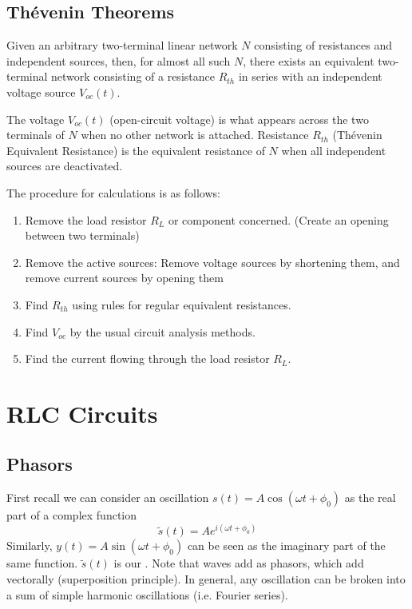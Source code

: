 \documentclass[12pt, a4paper, oneside, openright, titlepage]{book}
\begin{document}
\subsection{Th\'{e}venin Theorems}

\begin{thm}
    Given an arbitrary two-terminal linear network $N$ consisting of resistances and independent sources, then, for almost all such $N$, there exists an equivalent two-terminal network consisting of a resistance $R_{th}$ in series with an independent voltage source $V_{oc}(t)$.
\end{thm}

The voltage $V_{oc}(t)$ (open-circuit voltage) is what appears across the two terminals of $N$ when no other network is attached. Resistance $R_{th}$ (Th\'{e}venin Equivalent Resistance) is the equivalent resistance of $N$ when all independent sources are deactivated.

The procedure for calculations is as follows:

\begin{enumerate}
    \item Remove the load resistor $R_L$ or component concerned. (Create an opening between two terminals)
    \item Remove the active sources: Remove voltage sources by shortening them, and remove current sources by opening them
    \item Find $R_{th}$ using rules for regular equivalent resistances.
    \item Find $V_{oc}$ by the usual circuit analysis methods.
    \item Find the current flowing through the load resistor $R_L$.
\end{enumerate}


\section{RLC Circuits}

\subsection{Phasors}

First recall we can consider an oscillation $s(t) = A\cos(\omega t+\phi_0)$ as the real part of a complex function $$\tilde{s}(t) = Ae^{i(\omega t+\phi_0)}$$ Similarly, $y(t) = A\sin(\omega t+\phi_0)$ can be seen as the imaginary part of the same function. $\tilde{s}(t)$ is our . Note that waves add as phasors, which add vectorally (superposition principle). In general, any oscillation can be broken into a sum of simple harmonic oscillations (i.e. Fourier series). 
\end{document}
